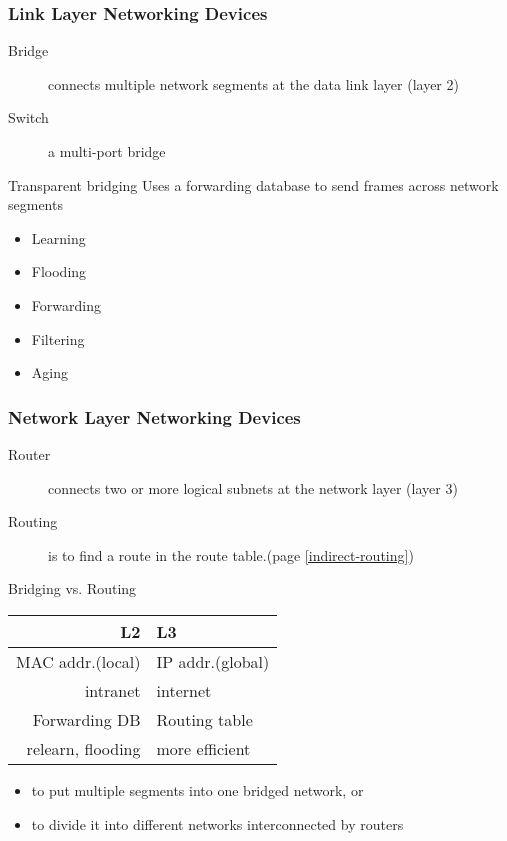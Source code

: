 \documentclass[hyperref={xetex,colorlinks,linkcolor=blue},green,compress]{beamer}
\begin{document}
  
  \begin{frame} \frametitle{Link Layer Networking Devices}
    \begin{description}
    \item[Bridge] connects multiple network segments at the data link layer (layer 2)
    \item[Switch] a multi-port bridge
    \end{description}
    \begin{exampleblock}{Transparent bridging}
      Uses a forwarding database to send frames across network segments
      \begin{itemize}
      \item Learning
      \item Flooding
      \item Forwarding
      \item Filtering
      \item Aging
      \end{itemize}
    \end{exampleblock}
  \end{frame}
  
  \begin{frame} \frametitle{Network Layer Networking Devices}
    \begin{description}
    \item[Router] connects two or more logical subnets at the network
      layer (layer 3)
    \item[Routing] is to find a route in the route table.(page \ref{indirect-routing})
    \end{description}
    \begin{exampleblock}{Bridging vs. Routing}
      \begin{center}
        \begin{tabular}{r|l}
          L2&L3\\\hline
          MAC addr.(local)&IP addr.(global)\\\hline
          intranet&internet\\\hline
          Forwarding DB&Routing table\\\hline
          relearn, flooding&more efficient
        \end{tabular}
      \end{center}
    \end{exampleblock}
    \begin{itemize}
    \item to put multiple segments into one bridged network, or
    \item to divide it into different networks interconnected by routers
    \end{itemize}
  \end{frame}
  
\end{document}
